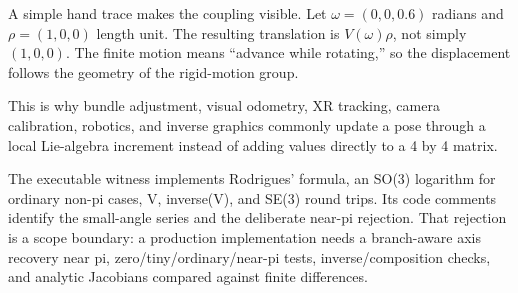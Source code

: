 A simple hand trace makes the coupling visible. Let \(\omega=(0,0,0.6)\) radians and \(\rho=(1,0,0)\) length unit. The resulting translation is \(V(\omega)\rho\), not simply \((1,0,0)\). The finite motion means ``advance while rotating,'' so the displacement follows the geometry of the rigid-motion group.

This is why bundle adjustment, visual odometry, XR tracking, camera calibration, robotics, and inverse graphics commonly update a pose through a local Lie-algebra increment instead of adding values directly to a 4 by 4 matrix.

The executable witness implements Rodrigues' formula, an SO(3) logarithm for ordinary non-pi cases, V, inverse(V), and SE(3) round trips. Its code comments identify the small-angle series and the deliberate near-pi rejection. That rejection is a scope boundary: a production implementation needs a branch-aware axis recovery near pi, zero/tiny/ordinary/near-pi tests, inverse/composition checks, and analytic Jacobians compared against finite differences.

